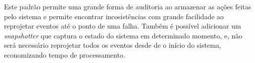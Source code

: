 Este padrão permite uma grande forma de auditoria ao armazenar as ações
feitas pelo sistema e permite encontrar incosistências com grande facilidade
ao reprojetar eventos até o ponto de uma falha. Também é possível adicionar
um \textit{snapshotter} que captura o estado do sistema em determinado
momento, e, não será necessário reprojetar todos os eventos desde de o início
do sistema, economizando tempo de processamento\cite{event-sourcing}.
